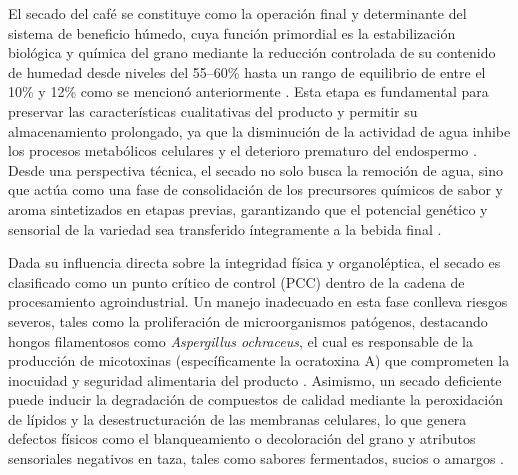 El secado del café se constituye como la operación final y determinante del sistema de beneficio húmedo, cuya función primordial es la estabilización biológica y química del grano mediante la reducción controlada de su contenido de humedad desde niveles del 55--60\% hasta un rango de equilibrio de entre el 10\% y 12\% como se mencionó anteriormente \parencite{osorio_hernandez_simulation_2015}. Esta etapa es fundamental para preservar las características cualitativas del producto y permitir su almacenamiento prolongado, ya que la disminución de la actividad de agua inhibe los procesos metabólicos celulares y el deterioro prematuro del endospermo \parencite{osorio_hernandez_simulation_2015, osorio_hernandez_bioclimatic_2018}. Desde una perspectiva técnica, el secado no solo busca la remoción de agua, sino que actúa como una fase de consolidación de los precursores químicos de sabor y aroma sintetizados en etapas previas, garantizando que el potencial genético y sensorial de la variedad sea transferido íntegramente a la bebida final \parencite{barbosa_sensory_2019, de_bruyn_exploring_2017}.

Dada su influencia directa sobre la integridad física y organoléptica, el secado es clasificado como un punto crítico de control (PCC) dentro de la cadena de procesamiento agroindustrial. Un manejo inadecuado en esta fase conlleva riesgos severos, tales como la proliferación de microorganismos patógenos, destacando hongos filamentosos como \textit{Aspergillus ochraceus}, el cual es responsable de la producción de micotoxinas (específicamente la ocratoxina A) que comprometen la inocuidad y seguridad alimentaria del producto \parencite{osorio_hernandez_bioclimatic_2018, osorio_hernandez_computational_2020}. Asimismo, un secado deficiente puede inducir la degradación de compuestos de calidad mediante la peroxidación de lípidos y la desestructuración de las membranas celulares, lo que genera defectos físicos como el blanqueamiento o decoloración del grano y atributos sensoriales negativos en taza, tales como sabores fermentados, sucios o amargos \parencite{escuela_superior_politecnica_agropecuaria_de_manabi_manuel_felix_lopez_carrera_de_ingenieria_agricola_postharvest_2023, osorio_hernandez_simulation_2015, taveira_perfis_2012}.

